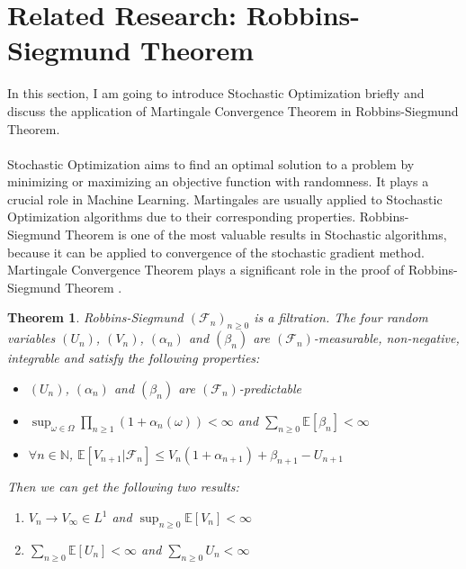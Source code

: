 \documentclass[10pt]{article}
\newtheorem{theorem}{Theorem}
\begin{document}
\section{Related Research: Robbins-Siegmund Theorem}
In this section, I am going to introduce Stochastic Optimization briefly and discuss the application of Martingale Convergence Theorem in Robbins-Siegmund Theorem.\\\\
Stochastic Optimization aims to find an optimal solution to a problem by minimizing or maximizing an objective function with randomness. It plays a crucial role in Machine Learning. Martingales are usually applied to Stochastic Optimization algorithms due to their corresponding properties. Robbins-Siegmund Theorem is one of the most valuable results in Stochastic algorithms, because it can be applied to convergence of the stochastic gradient method.  Martingale Convergence Theorem plays a significant role in the proof of Robbins-Siegmund Theorem \cite{S.Gadat:2018}.
\begin{theorem}{Robbins-Siegmund}
 $(\mathcal{F}_n)_{n \ge 0}$ is a filtration. The four random variables $(U_n)$, $(V_n)$, $(\alpha_n)$ and $(\beta_n)$ are $(\mathcal{F}_n)$-measurable, non-negative, integrable and satisfy the following properties:
 \begin{itemize}
     \item $(U_n)$, $(\alpha_n)$ and $(\beta_n)$ are $(\mathcal{F}_n)$-predictable
     \item $\sup_{\omega \in \Omega}\prod_{n \ge 1}(1+\alpha_n(\omega))<\infty$ and $\sum_{n \ge 0}\mathbb{E}[\beta_n]<\infty$
     \item $\forall n \in \mathbb{N}$, $\mathbb{E}[V_{n+1}|\mathcal{F}_n]\le V_n(1+\alpha_{n+1})+\beta_{n+1}-U_{n+1}$
 \end{itemize}
 Then we can get the following two results:
 \begin{enumerate}
     \item $V_n \to V_{\infty} \in L^1$ and $\sup_{n \ge 0}\mathbb{E}[V_n]<\infty$
     \item $\sum_{n \ge 0}\mathbb{E}[U_n]<\infty$ and $\sum_{n \ge 0}U_n<\infty$
 \end{enumerate}
 
\end{theorem}
\end{document}
